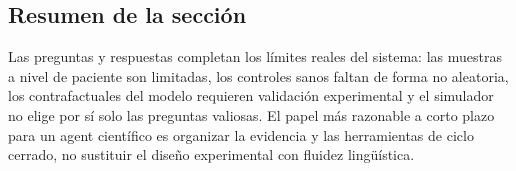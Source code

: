 \subsection{Resumen de la sección}

Las preguntas y respuestas completan los límites reales del sistema: las muestras a nivel de paciente son limitadas, los controles sanos faltan de forma no aleatoria, los contrafactuales del modelo requieren validación experimental y el simulador no elige por sí solo las preguntas valiosas. El papel más razonable a corto plazo para un agent científico es organizar la evidencia y las herramientas de ciclo cerrado, no sustituir el diseño experimental con fluidez lingüística.

